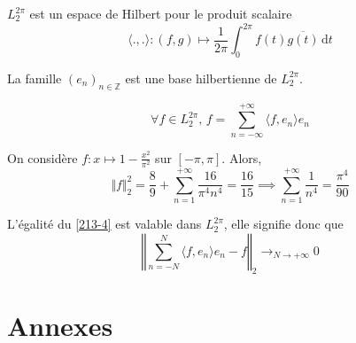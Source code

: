   \begin{proposition}
    $L_2^{2\pi}$ est un espace de Hilbert pour le produit scalaire
    \[ \langle ., . \rangle : (f, g) \mapsto \frac{1}{2 \pi} \int_0^{2\pi} f(t) \overline{g(t)} \, \mathrm{d}t \]
  \end{proposition}


  \begin{theorem}
    La famille $(e_n)_{n \in \mathbb{Z}}$ est une base hilbertienne de $L_2^{2 \pi}$.
  \end{theorem}

  \begin{corollary}
    \label{213-4}
    \[ \forall f \in L_2^{2 \pi}, \, f = \sum_{n = -\infty}^{+\infty} \langle f, e_n \rangle e_n \]
  \end{corollary}


  \begin{example}
    On considère $f : x \mapsto 1 - \frac{x^2}{\pi^2}$ sur $[-\pi, \pi]$. Alors,
    \[ \Vert f \Vert^2_2 = \frac{8}{9} + \sum_{n=1}^{+\infty} \frac{16}{\pi^4 n^4} = \frac{16}{15} \implies \sum_{n=1}^{+\infty} \frac{1}{n^4} = \frac{\pi^4}{90} \]
  \end{example}


  \begin{remark}
    L'égalité du \cref{213-4} est valable dans $L_2^{2\pi}$, elle signifie donc que
    \[ \left\Vert \sum_{n = -N}^{N} \langle f, e_n \rangle e_n - f \right\Vert_2 \longrightarrow_{N \rightarrow +\infty} 0 \]
  \end{remark}

  \newpage
  \section*{Annexes}


